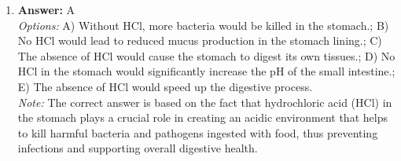 \documentclass[12pt]{article}
\begin{document}
\begin{enumerate}[label=\arabic*.]
\\ \textit{Options:} A) Taste, wind direction, humidity; B) Atmospheric oxygen levels, plant growth, tidal patterns; C) Infrared radiation, sound frequency, barometric pressure; D) Moon phases, echo location, gravitational pull; E) Sunlight intensity, water current, soil composition
\\ \textit{Note:} Animals utilize various environmental cues, such as taste, wind direction, and humidity, to navigate during migration, as these factors provide critical information about their surroundings and help them orient themselves effectively.
\item \textbf{Answer:} A
\\ \textit{Options:} A) Without HCl, more bacteria would be killed in the stomach.; B) No HCl would lead to reduced mucus production in the stomach lining.; C) The absence of HCl would cause the stomach to digest its own tissues.; D) No HCl in the stomach would significantly increase the pH of the small intestine.; E) The absence of HCl would speed up the digestive process.
\\ \textit{Note:} The correct answer is based on the fact that hydrochloric acid (HCl) in the stomach plays a crucial role in creating an acidic environment that helps to kill harmful bacteria and pathogens ingested with food, thus preventing infections and supporting overall digestive health.
\end{enumerate}
\end{document}

